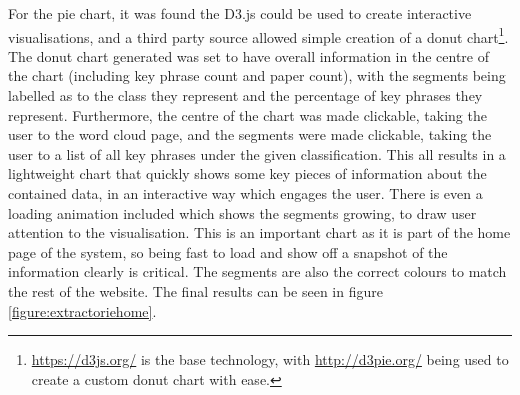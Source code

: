 For the pie chart, it was found the D3.js could be used to create interactive visualisations, and a third party source allowed simple creation of a donut chart\footnote{\href{https://d3js.org/}{https://d3js.org/} is the base technology, with \href{http://d3pie.org/}{http://d3pie.org/} being used to create a custom donut chart with ease.}. The donut chart generated was set to have overall information in the centre of the chart (including key phrase count and paper count), with the segments being labelled as to the class they represent and the percentage of key phrases they represent. Furthermore, the centre of the chart was made clickable, taking the user to the word cloud page, and the segments were made clickable, taking the user to a list of all key phrases under the given classification. This all results in a lightweight chart that quickly shows some key pieces of information about the contained data, in an interactive way which engages the user. There is even a loading animation included which shows the segments growing, to draw user attention to the visualisation. This is an important chart as it is part of the home page of the system, so being fast to load and show off a snapshot of the information clearly is critical. The segments are also the correct colours to match the rest of the website. The final results can be seen in figure \ref{figure:extractoriehome}.

